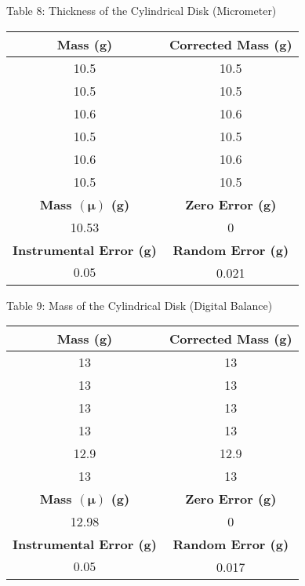 \begin{center}
\begin{center}
\begin{tabular}{|c|c|}
    \end{tabular}
\end{center}
Table 8: Thickness of the Cylindrical Disk (Micrometer)
\begin{center}
    \begin{tabular}{|c|c|}
        \hline
        \textbf{Mass (g)} & \textbf{Corrected Mass (g)} \\
        \hline
        10.5 & 10.5 \\
        \hline
        10.5 & 10.5 \\
        \hline
        10.6 & 10.6 \\
        \hline
        10.5 & 10.5  \\
        \hline
        10.6 & 10.6  \\
        \hline
        10.5 & 10.5 \\
        \hline
        \hline
        \textbf{Mass $(\bm{\mu})$ (g)} & \textbf{Zero Error (g)}  \\
        \hline
        10.53 & 0 \\
        \hline
        \hline
        \textbf{Instrumental Error (g)} & \textbf{Random Error (g)}  \\
        \hline
        \(0.05\) & 0.021 \\
        \hline
    \end{tabular}
\end{center}
Table 9: Mass of the Cylindrical Disk (Digital Balance)
\begin{center}
    \begin{tabular}{|c|c|}
        \hline
        \textbf{Mass (g)} & \textbf{Corrected Mass (g)} \\
        \hline
        13 & 13 \\
        \hline
        13 & 13 \\
        \hline
        13 & 13 \\
        \hline
        13 & 13 \\
        \hline
        12.9 & 12.9 \\
        \hline
        13 & 13 \\
        \hline
        \hline
        \textbf{Mass $(\bm{\mu})$ (g)} & \textbf{Zero Error (g)}  \\
        \hline
        12.98 & 0 \\
        \hline
        \hline
        \textbf{Instrumental Error (g)} & \textbf{Random Error (g)}  \\
        \hline
        \(0.05\) & 0.017 \\

\end{tabular}
\end{center}
\end{center}
